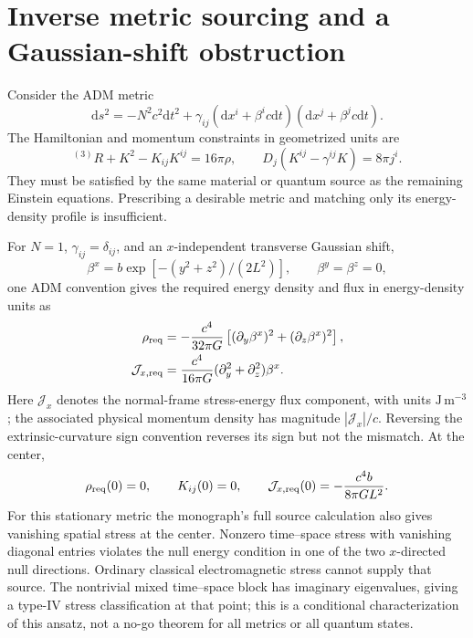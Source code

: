 \documentclass[11pt,oneside]{report}
\newcommand{\dd}{\mathrm d}
\begin{document}
\section{Inverse metric sourcing and a Gaussian-shift obstruction}
Consider the ADM metric
\begin{equation}
\dd s^2=-N^2c^2\dd t^2+
\gamma_{ij}(\dd x^i+\beta^ic\dd t)(\dd x^j+\beta^jc\dd t).
\end{equation}
The Hamiltonian and momentum constraints in geometrized units are
\begin{equation}
{}^{(3)}R+K^2-K_{ij}K^{ij}=16\pi\rho,\qquad
D_j(K^{ij}-\gamma^{ij}K)=8\pi j^i.
\end{equation}
They must be satisfied by the same material or quantum source as the remaining Einstein equations. Prescribing a desirable metric and matching only its energy-density profile is insufficient.

For $N=1$, $\gamma_{ij}=\delta_{ij}$, and an $x$-independent transverse Gaussian shift,
\begin{equation}
\beta^x=b\exp[-(y^2+z^2)/(2L^2)],\qquad\beta^y=\beta^z=0,
\end{equation}
one ADM convention gives the required energy density and flux in energy-density units as
\begin{align}
\rho_{\rm req}&=-\frac{c^4}{32\pi G}
\left[(\partial_y\beta^x)^2+(\partial_z\beta^x)^2\right],\\
\mathcal J_{x,\rm req}&=\frac{c^4}{16\pi G}
(\partial_y^2+\partial_z^2)\beta^x.
\end{align}
Here $\mathcal J_x$ denotes the normal-frame stress-energy flux component, with units $\mathrm{J\,m^{-3}}$; the associated physical momentum density has magnitude $|\mathcal J_x|/c$. Reversing the extrinsic-curvature sign convention reverses its sign but not the mismatch. At the center,
\begin{equation}
\rho_{\rm req}(0)=0,\qquad K_{ij}(0)=0,\qquad
\mathcal J_{x,\rm req}(0)=-\frac{c^4b}{8\pi GL^2}.
\end{equation}
For this stationary metric the monograph's full source calculation also gives vanishing spatial stress at the center. Nonzero time--space stress with vanishing diagonal entries violates the null energy condition in one of the two $x$-directed null directions. Ordinary classical electromagnetic stress cannot supply that source. The nontrivial mixed time--space block has imaginary eigenvalues, giving a type-IV stress classification at that point; this is a conditional characterization of this ansatz, not a no-go theorem for all metrics or all quantum states.
\end{document}
